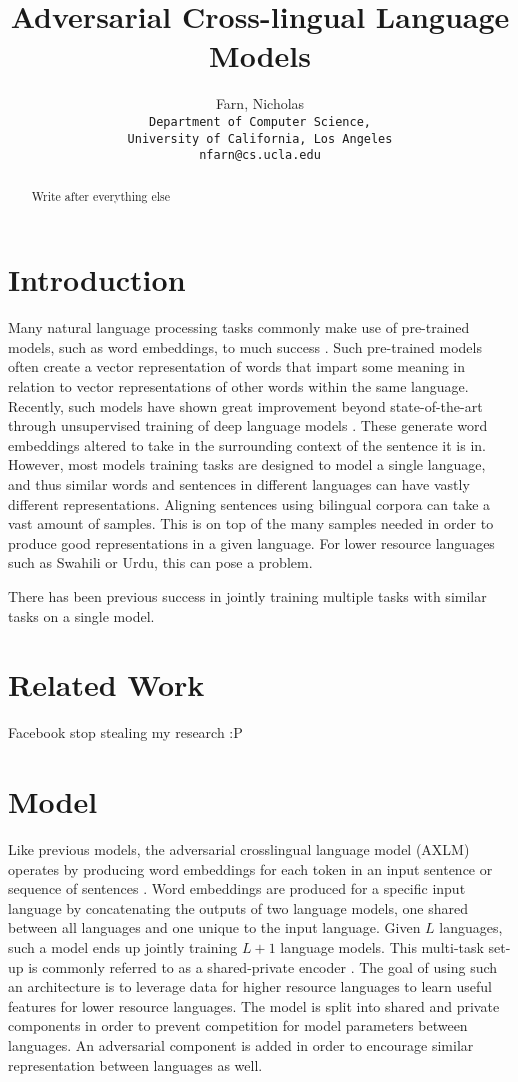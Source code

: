 \documentclass[10pt,letterpaper]{article}
\title{Adversarial Cross-lingual Language Models}
\author{Farn, Nicholas\\
	\texttt{Department of Computer Science,}\\
	\texttt{University of California, Los Angeles}\\
	\texttt{nfarn@cs.ucla.edu}
}
\begin{document}
\maketitle
\begin{abstract}
Write after everything else
\end{abstract}

\begin{multicols}{2}
\section{Introduction}
Many natural language processing tasks commonly make use of pre-trained models, such as word embeddings, to much success \cite{}.  Such pre-trained models often create a vector representation of words that impart some meaning in relation to vector representations of other words within the same language.  Recently, such models have shown great improvement beyond state-of-the-art through unsupervised training of deep language models \cite{bert, openai, elmo}.  These generate word embeddings altered to take in the surrounding context of the sentence it is in.  However, most models training tasks are designed to model a single language, and thus similar words and sentences in different languages can have vastly different representations.  Aligning sentences using bilingual corpora can take a vast amount of samples.  This is on top of the many samples needed in order to produce good representations in a given language.  For lower resource languages such as Swahili or Urdu, this can pose a problem.  

There has been previous success in jointly training multiple tasks with similar tasks on a single model.

\section{Related Work}
Facebook stop stealing my research :P

\section{Model}
Like previous models, the adversarial crosslingual language model (AXLM) operates by producing word embeddings for each token in an input sentence or sequence of sentences \cite{bert, openai, elmo, xlm}.  Word embeddings are produced for a specific input language by concatenating the outputs of two language models, one shared between all languages and one unique to the input language.  Given $L$ languages, such a model ends up jointly training $L+1$ language models.  This multi-task set-up is commonly referred to as a shared-private encoder \cite{Chen16}.  The goal of using such an architecture is to leverage data for higher resource languages to learn useful features for lower resource languages.  The model is split into shared and private components in order to prevent competition for model parameters between languages.  An adversarial component is added in order to encourage similar representation between languages as well.


\end{multicols}
\end{document}
